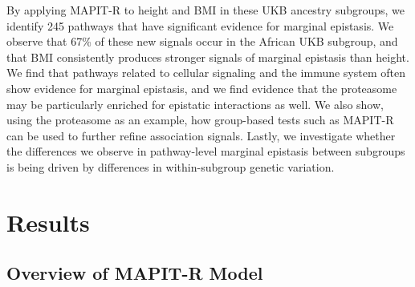 \documentclass[12pt,a4paper]{article}
\begin{document}
By applying MAPIT-R to height and BMI in these UKB ancestry subgroups, we identify 245 pathways that have significant evidence for marginal epistasis. We observe that 67\% of these new signals occur in the African UKB subgroup, and that BMI consistently produces stronger signals of marginal epistasis than height. We find that pathways related to cellular signaling and the immune system often show evidence for marginal epistasis, and we find evidence that the proteasome may be particularly enriched for epistatic interactions as well. We also show, using the proteasome as an example, how group-based tests such as MAPIT-R can be used to further refine association signals. Lastly, we investigate whether the differences we observe in pathway-level marginal epistasis between subgroups is being driven by differences in within-subgroup genetic variation. 

\section{Results}\label{InterPath-Results}

\subsection{Overview of MAPIT-R Model}\label{InterPath-Results-MAPITRModel}
\end{document}
